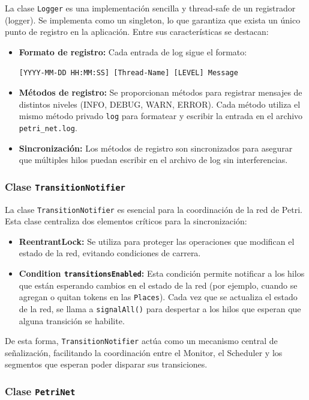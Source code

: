 \documentclass[12pt]{article}
\begin{document}
La clase \texttt{Logger} es una implementación sencilla y thread-safe de un registrador (logger). Se implementa como un singleton, lo que garantiza que exista un único punto de registro en la aplicación. Entre sus características se destacan:
\begin{itemize}
    \item \textbf{Formato de registro:} Cada entrada de log sigue el formato:
    \begin{center}
        \texttt{[YYYY-MM-DD HH:MM:SS] [Thread-Name] [LEVEL] Message}
    \end{center}
    \item \textbf{Métodos de registro:} Se proporcionan métodos para registrar mensajes de distintos niveles (INFO, DEBUG, WARN, ERROR). Cada método utiliza el mismo método privado \texttt{log} para formatear y escribir la entrada en el archivo \texttt{petri\_net.log}.
    \item \textbf{Sincronización:} Los métodos de registro son sincronizados para asegurar que múltiples hilos puedan escribir en el archivo de log sin interferencias.
\end{itemize}

\subsubsection{Clase \texttt{TransitionNotifier}}

La clase \texttt{TransitionNotifier} es esencial para la coordinación de la red de Petri. Esta clase centraliza dos elementos críticos para la sincronización:
\begin{itemize}
    \item \textbf{ReentrantLock:} Se utiliza para proteger las operaciones que modifican el estado de la red, evitando condiciones de carrera.
    \item \textbf{Condition \texttt{transitionsEnabled}:} Esta condición permite notificar a los hilos que están esperando cambios en el estado de la red (por ejemplo, cuando se agregan o quitan tokens en las \texttt{Places}). Cada vez que se actualiza el estado de la red, se llama a \texttt{signalAll()} para despertar a los hilos que esperan que alguna transición se habilite.
\end{itemize}
De esta forma, \texttt{TransitionNotifier} actúa como un mecanismo central de señalización, facilitando la coordinación entre el Monitor, el Scheduler y los segmentos que esperan poder disparar sus transiciones.

\subsubsection{Clase \texttt{PetriNet}}
\end{document}

